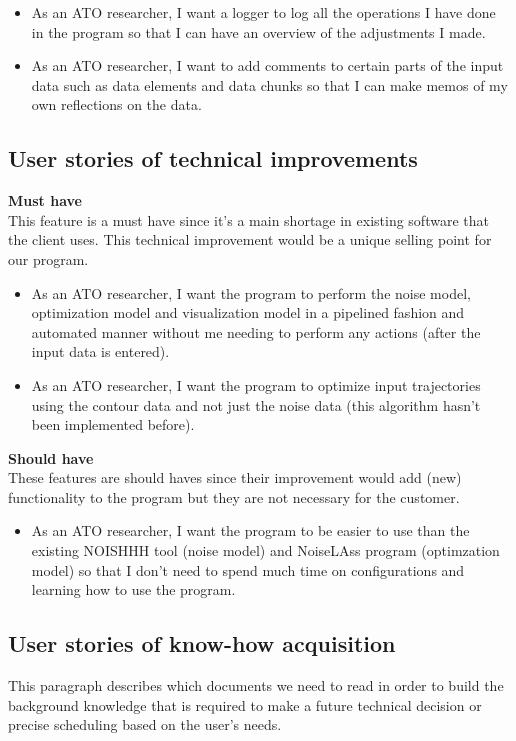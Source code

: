 \documentclass[a4paper,english,fleqn]{exam}
\begin{document}
\begin{itemize}
\item As an ATO researcher, I want a logger to log all the operations I have done in the program so that I can have an overview of the adjustments I made.
\item As an ATO researcher, I want to add comments to certain parts of the input data such as data elements and data chunks so that I can make memos of my own reflections on the data.
\end{itemize}

\newpage
\subsection{User stories of technical improvements}
\textbf{Must have} \\
This feature is a must have since it's a main shortage in existing software that the client uses. This technical improvement would be a unique selling point for our program. 
\begin{itemize}
\item As an ATO researcher, I want the program to perform the noise model, optimization model and visualization model in a pipelined fashion and automated manner without me needing to perform any actions (after the input data is entered).
\item As an ATO researcher, I want the program to optimize input trajectories using the contour data and not just the noise data (this algorithm hasn't been implemented before).
\end{itemize}

\textbf{Should have} \\
These features are should haves since their improvement would add (new) functionality to the program but they are not necessary for the customer. 
\begin{itemize}
\item As an ATO researcher, I want the program to be easier to use than the existing NOISHHH tool (noise model) and NoiseLAss program (optimzation model) so that I don't need to spend much time on configurations and learning how to use the program.
\end{itemize}

\subsection{User stories of know-how acquisition}
This paragraph describes which documents we need to read in order to build the background knowledge that is required to make a future technical decision or precise scheduling based on the user's needs. 
\end{document}
